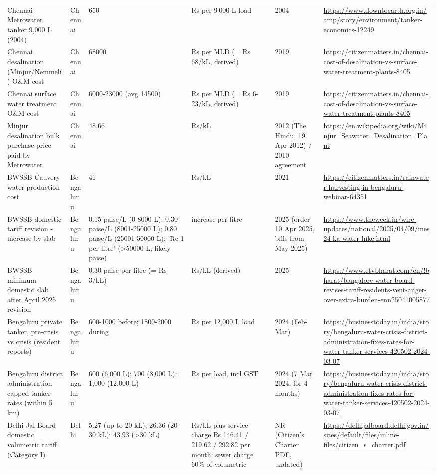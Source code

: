 {\begin{longtable}{p{4cm} p{1.5cm} p{2.5cm} p{2.1cm} p{1.7cm} p{3.4cm}}
Chennai Metrowater tanker 9,000 L (2004) & Chennai & 650 & Rs per 9,000 L load & 2004 & \url{https://www.downtoearth.org.in/amp/story/environment/tanker-economics-12249}\\
Chennai desalination (Minjur/Nemmeli) O\&M cost & Chennai & 68000 & Rs per MLD (= Rs 68/kL, derived) & 2019 & \url{https://citizenmatters.in/chennai-cost-of-desalination-vs-surface-water-treatment-plants-8405}\\
Chennai surface water treatment O\&M cost & Chennai & 6000-23000 (avg 14500) & Rs per MLD (= Rs 6-23/kL, derived) & 2019 & \url{https://citizenmatters.in/chennai-cost-of-desalination-vs-surface-water-treatment-plants-8405}\\
Minjur desalination bulk purchase price paid by Metrowater & Chennai & 48.66 & Rs/kL & 2012 (The Hindu, 19 Apr 2012) / 2010 agreement & \url{https://en.wikipedia.org/wiki/Minjur_Seawater_Desalination_Plant}\\
BWSSB Cauvery water production cost & Bengaluru & 41 & Rs/kL & 2021 & \url{https://citizenmatters.in/rainwater-harvesting-in-bengaluru-webinar-64351}\\
BWSSB domestic tariff revision - increase by slab & Bengaluru & 0.15 paise/L (0-8000 L); 0.30 paise/L (8001-25000 L); 0.80 paise/L (25001-50000 L); 'Re 1 per litre' (>50000 L, likely paise) & increase per litre & 2025 (order 10 Apr 2025, bills from May 2025) & \url{https://www.theweek.in/wire-updates/national/2025/04/09/mes24-ka-water-hike.html}\\
BWSSB minimum domestic slab after April 2025 revision & Bengaluru & 0.30 paise per litre (= Rs 3/kL) & Rs/kL (derived) & 2025 & \url{https://www.etvbharat.com/en/!bharat/bangalore-water-board-revises-tariff-residents-vent-anger-over-extra-burden-enn25041005877}\\
Bengaluru private tanker, pre-crisis vs crisis (resident reports) & Bengaluru & 600-1000 before; 1800-2000 during & Rs per 12,000 L load & 2024 (Feb-Mar) & \url{https://businesstoday.in/india/story/bengaluru-water-crisis-district-administration-fixes-rates-for-water-tanker-services-420502-2024-03-07}\\
Bengaluru district administration capped tanker rates (within 5 km) & Bengaluru & 600 (6,000 L); 700 (8,000 L); 1,000 (12,000 L) & Rs per load, incl GST & 2024 (7 Mar 2024, for 4 months) & \url{https://businesstoday.in/india/story/bengaluru-water-crisis-district-administration-fixes-rates-for-water-tanker-services-420502-2024-03-07}\\
Delhi Jal Board domestic volumetric tariff (Category I) & Delhi & 5.27 (up to 20 kL); 26.36 (20-30 kL); 43.93 (>30 kL) & Rs/kL plus service charge Rs 146.41 / 219.62 / 292.82 per month; sewer charge 60\% of volumetric & NR (Citizen's Charter PDF, undated) & \url{https://delhijalboard.delhi.gov.in/sites/default/files/inline-files/citizen_s_charter.pdf}\\

\end{longtable}}
